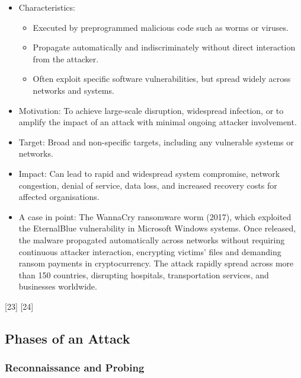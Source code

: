 \begin{itemize}
  \item Characteristics:
  \begin{itemize}
    \item Executed by preprogrammed malicious code such as worms or viruses.
    \item Propagate automatically and indiscriminately without direct interaction from the attacker.
    \item Often exploit specific software vulnerabilities, but spread widely across networks and systems.
  \end{itemize}
  \item Motivation: To achieve large-scale disruption, widespread infection, or to amplify the impact of an attack with minimal ongoing attacker involvement.
  \item Target: Broad and non-specific targets, including any vulnerable systems or networks.
  \item Impact: Can lead to rapid and widespread system compromise, network congestion, denial of service, data loss, and increased recovery costs for affected organisations.
  \item A case in point: The WannaCry ransomware worm (2017), which exploited the EternalBlue vulnerability in Microsoft Windows systems. Once released, the malware propagated automatically across networks without requiring continuous attacker interaction, encrypting victims' files and demanding ransom payments in cryptocurrency. The attack rapidly spread across more than 150 countries, disrupting hospitals, transportation services, and businesses worldwide.
\end{itemize}

[23] [24]

\subsection{Phases of an Attack}

\subsubsection{Reconnaissance and Probing}

